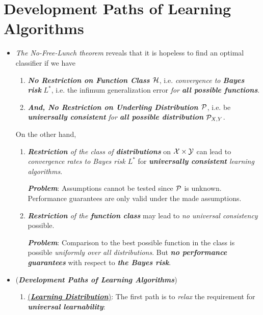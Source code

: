 \documentclass[11pt]{article}
\begin{document}
\section{Development Paths of  Learning Algorithms}
\begin{itemize}
\item \begin{remark} \emph{The No-Free-Lunch theorem} reveals that it is hopeless to find an optimal classifier if we have
\begin{enumerate}
\item \emph{\textbf{No Restriction on Function Class ${\mathcal H}$}}, i.e. \emph{convergence to \textbf{Bayes risk}} $L^{*}$, i.e. the infimum generalization error \emph{for \textbf{all possible functions}}.

\item \emph{\textbf{And, No Restriction on Underling Distribution ${\mathcal P}$}}, i.e. be \emph{\textbf{universally consistent} for \textbf{all possible distribution} ${\mathcal P}_{X, Y}$}.
\end{enumerate}
On the other hand, 
\begin{enumerate}
\item \emph{\textbf{Restriction} of the class of \textbf{distributions}} on ${\mathcal X} \times {\mathcal Y}$ can lead to \emph{convergence rates to Bayes risk $L^{*}$} for \emph{\textbf{universally consistent} learning algorithms}.

\emph{\textbf{Problem}}: Assumptions cannot be tested since ${\mathcal P}$ is unknown. Performance guarantees are only valid under the made assumptions.

\item \emph{\textbf{Restriction} of the \textbf{function class}} may lead to \emph{no universal consistency} possible.

\emph{\textbf{Problem}}:  Comparison to the best possible function in the class is possible \emph{uniformly over all distributions}. But \emph{\textbf{no performance guarantees}} with respect to \emph{\textbf{the Bayes risk}}.
\end{enumerate}
\end{remark}

\item \begin{remark} (\textbf{\emph{Development Paths of Learning Algorithms}})
\begin{enumerate}
\item \underline{(\textbf{\emph{Learning Distribution}})}: The first path is to \emph{relax} the requirement for \emph{\textbf{universal learnability}}:


\end{enumerate}
\end{remark}
\end{itemize}
\end{document}
